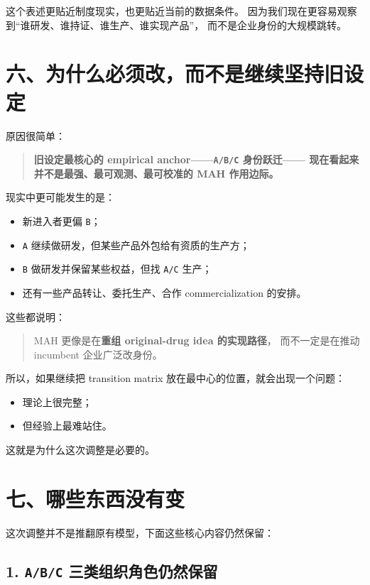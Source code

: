 \documentclass[12pt,fontset=none]{ctexart}
\begin{document}
这个表述更贴近制度现实，也更贴近当前的数据条件。
因为我们现在更容易观察到“谁研发、谁持证、谁生产、谁实现产品”，
而不是企业身份的大规模跳转。

\section{六、为什么必须改，而不是继续坚持旧设定}

原因很简单：

\begin{quote}
\textbf{旧设定最核心的 empirical anchor——\texttt{A/B/C} 身份跃迁——
现在看起来并不是最强、最可观测、最可校准的 MAH 作用边际。}
\end{quote}

现实中更可能发生的是：

\begin{itemize}[leftmargin=2em]
    \item 新进入者更偏 \texttt{B}；
    \item \texttt{A} 继续做研发，但某些产品外包给有资质的生产方；
    \item \texttt{B} 做研发并保留某些权益，但找 \texttt{A/C} 生产；
    \item 还有一些产品转让、委托生产、合作 commercialization 的安排。
\end{itemize}

这些都说明：

\begin{quote}
MAH 更像是在\textbf{重组 original-drug idea 的实现路径}，
而不一定是在推动 incumbent 企业广泛改身份。
\end{quote}

所以，如果继续把 transition matrix 放在最中心的位置，就会出现一个问题：

\begin{itemize}[leftmargin=2em]
    \item 理论上很完整；
    \item 但经验上最难站住。
\end{itemize}

这就是为什么这次调整是必要的。

\section{七、哪些东西没有变}

这次调整并不是推翻原有模型，下面这些核心内容仍然保留：

\subsection*{1. \texttt{A/B/C} 三类组织角色仍然保留}
\end{document}
